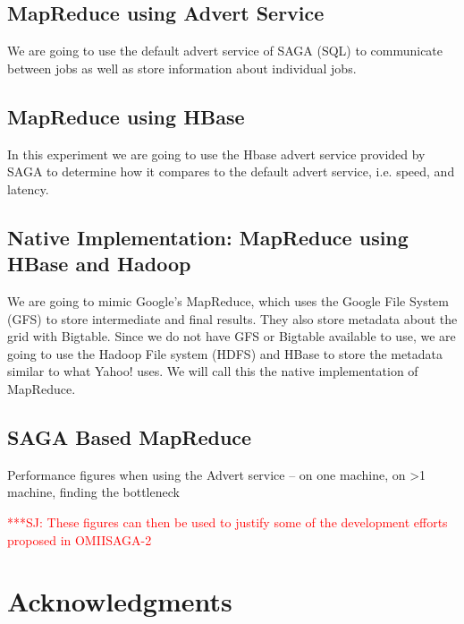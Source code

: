 \documentclass[conference,final]{IEEEtran}
\newcommand{\jhanote}[1]{ {\textcolor{red} { ***SJ: #1 }}}
\newcommand{\jhanote}[1]{}
\begin{document}
\begin{figure}[t]
      \centering
          \caption{}
      \label{sagaallpairs}
\end{figure}


\begin{figure}[t]
      \centering
          \caption{}
      \label{saga_allpairs_1and3workers.png}
\end{figure}

\subsection*{MapReduce using Advert Service}
We are going to use the default advert service of SAGA (SQL) to 
communicate between jobs as well as store information about 
individual jobs.

\subsection*{MapReduce using HBase}
In this experiment we are going to use the Hbase advert service 
provided by SAGA to determine how it compares to the default advert 
service, i.e. speed, and latency.

\subsection*{Native Implementation: MapReduce using HBase and Hadoop}
We are going to mimic Google's MapReduce, which uses the Google File
System (GFS) to store intermediate and final results.  They also store
metadata about the grid with Bigtable.  Since we do not have GFS or
Bigtable available to use, we are going to use the Hadoop File system
(HDFS) and HBase to store the metadata similar to what Yahoo! uses.
We will call this the native implementation of MapReduce.

\subsection*{SAGA Based MapReduce}

Performance figures when using the Advert service -- on one machine,
on >1 machine, finding the bottleneck

\jhanote{These figures can then be used to justify some of the 
  development efforts proposed in OMIISAGA-2}

\section{Acknowledgments}



\end{document}
